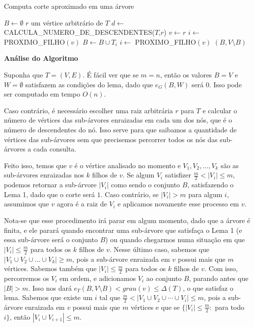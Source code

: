 \documentclass[a4paper,12pt]{article}
\begin{document}
\begin{algorithm}[H]

	\caption{Computa corte aproximado em uma árvore}
	$B \gets \emptyset$\;
	{
		$r$ um vértice arbitrário de $T$\;
		$d \gets $ CALCULA\_NUMERO\_DE\_DESCENDENTES($T$,$r$)\;
		$v \gets r$\;
		{
		$i \gets$ PROXIMO\_FILHO$(v)$\;
		{
			$B\gets B\cup T_i$\;
			$i\gets$ PROXIMO\_FILHO$(v)$
		}
		}
	}
	\Return $(B,V\setminus B)$

\end{algorithm}	

\bigskip
\bigskip

\textbf{Análise do Algoritmo}

	Suponha que $T=(V,E)$.
	É fácil ver que se $m=n$, então os valores $B = V$ e $W = \emptyset$ 
	satisfazem as condições do lema, dado que $e_G(B,W)$ será $0$. 
	Isso pode ser computado em tempo $O(n)$.

	Caso contrário, é necessário escolher uma raiz arbitrária $r$ para $T$
	e calcular o número de vértices das sub-árvores enraizadas 
	em cada um dos nós, que é o número de descendentes do nó.
	Isso serve para que saibamos a quantidade de vértices das sub-árvores
	sem que precisemos percorrer todos os nós das sub-árvores a cada consulta.

	Feito isso, temos que $v$ é o vértice analisado no momento e 
	$V_1, V_2, \ldots, V_k$ são as sub-árvores enraizadas nos $k$ filhos
	de $v$.
	Se algum $V_i$ satisfizer $\frac{m}{2}<|V_i|\le m$, podemos retornar
	a sub-árvore $|V_i|$ como sendo o conjunto $B$, satisfazendo o Lema 1,
	dado que o corte será $1$.
	Caso contrário, se $|V_i|> m$ para algum $i$, assumimos que 
	$v$ agora é a raiz de $V_i$ e aplicamos novamente esse processo em $v$.

	Nota-se que esse procedimento irá parar em algum momento, dado que a árvore 
	é finita, e ele parará quando encontrar
	uma sub-árvore que satisfaça o Lema 1 (e essa sub-árvore será o conjunto $B$) 
	ou quando chegarmos numa situação em que  
	$|V_i|\le \frac{m}{2}$ para todos os $k$ filhos de $v$.
	Nesse último caso, sabemos que $|V_1\cup V_2\cup \ldots \cup V_k|\ge m$, pois
	a sub-árvore enraizada em $v$ possui mais que $m$ vértices. 
	Sabemos também que $|V_i|\le \frac{m}{2}$ para todos os $k$ filhos de $v$. 
	Com isso, percorremos os $V_i$ em ordem, e 
	adicionamos $V_i$ ao conjunto $B$, parando antes que $|B| > m$. Isso nos dará
	$e_T(B,V\setminus B) < grau(v) \le \Delta(T)$, o que satisfaz o lema.
	Sabemos que existe um $i$ tal que 
	$\frac{m}{2} < |V_1 \cup V_2 \cup \cdots \cup V_i| \le m$, pois a sub-árvore
	enraizada em $v$ possui mais que $m$ vértices e que se 
	$\{|V_i|\le \frac{m}{2}:$ para todo $i\}$,
	então $|V_i \cup V_{i+1}| \le m$.
\end{document}

